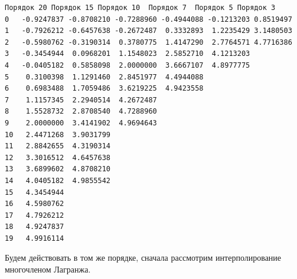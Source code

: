 \documentclass[11pt]{article}
\makeatletter
\newcommand{\boxspacing}{\kern\kvtcb@left@rule\kern\kvtcb@boxsep}
\newcommand{\prompt}[4]{
        {\ttfamily\llap{{\color{#2}[#3]:\hspace{3pt}#4}}\vspace{-\baselineskip}}
    }
\makeatother
\begin{document}
            \begin{tcolorbox}[breakable, size=fbox, boxrule=.5pt, pad at break*=1mm, opacityfill=0]
\prompt{Out}{outcolor}{41}{\boxspacing}
\begin{Verbatim}[commandchars=\\\{\}]
    Порядок 20 Порядок 15 Порядок 10  Порядок 7  Порядок 5 Порядок 3
0   -0.9247837 -0.8708210 -0.7288960 -0.4944088 -0.1213203 0.8519497
1   -0.7926212 -0.6457638 -0.2672487  0.3332893  1.2235429 3.1480503
2   -0.5980762 -0.3190314  0.3780775  1.4147290  2.7764571 4.7716386
3   -0.3454944  0.0968201  1.1548023  2.5852710  4.1213203
4   -0.0405182  0.5858098  2.0000000  3.6667107  4.8977775
5    0.3100398  1.1291460  2.8451977  4.4944088
6    0.6983488  1.7059486  3.6219225  4.9423558
7    1.1157345  2.2940514  4.2672487
8    1.5528732  2.8708540  4.7288960
9    2.0000000  3.4141902  4.9694643
10   2.4471268  3.9031799
11   2.8842655  4.3190314
12   3.3016512  4.6457638
13   3.6899602  4.8708210
14   4.0405182  4.9855542
15   4.3454944
16   4.5980762
17   4.7926212
18   4.9247837
19   4.9916114
\end{Verbatim}
\end{tcolorbox}
        
    Будем действовать в том же порядке, сначала рассмотрим интерполирование
многочленом Лагранжа.
\end{document}
